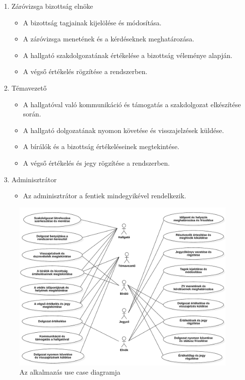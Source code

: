 \begin{enumerate}
\newpage
\item Záróvizsga bizottság elnöke
\begin{itemize}
\item A bizottság tagjainak kijelölése és módosítása.

\item A záróvizsga menetének és a kérdéseknek meghatározása.

\item A hallgató szakdolgozatának értékelése a bizottság véleménye alapján.

\item A végső értékelés rögzítése a rendszerben.
\end{itemize}

\item Témavezető

\begin{itemize}
\item A hallgatóval való kommunikáció és támogatás a szakdolgozat elkészítése során.

\item A hallgató dolgozatának nyomon követése és visszajelzések küldése.

\item A bírálók és a bizottság értékeléseinek megtekintése.

\item A végső értékelés és jegy rögzítése a rendszerben.


\end{itemize}

\item Adminisztrátor

\begin{itemize}

\item Az adminisztrátor a fentiek mindegyikével rendelkezik.

\end{itemize}

\end{enumerate}

\begin{figure}[ht]
\includegraphics[width=\textwidth]{images/UseCaseDiagram1.pdf}
\caption{Az alkalmazás use case diagramja}
\label{fig:usecase}
\end{figure}
\newpage

